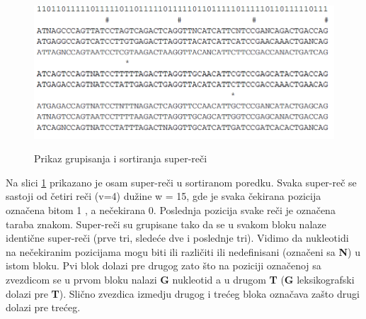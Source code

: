 \documentclass[a4paper]{article}
\begin{document}
{\begin{figure}[h!]
\begin{center}
\end{center}
\includegraphics[width=\textwidth]{superreci}
\label{fig:superreci}
\caption{Prikaz grupisanja i sortiranja super-reči}
\end{figure}

\indent Na slici \ref{fig:superreci} prikazano je osam super-reči u sortiranom poredku. Svaka super-reč se sastoji od četiri reči (v=4) dužine w = 15, gde je svaka čekirana pozicija označena bitom 1 , a nečekirana 0. Poslednja pozicija svake reči je označena taraba znakom. Super-reči su grupisane tako da se u svakom bloku nalaze identične super-reči (prve tri, sledeće dve i poslednje tri). Vidimo da nukleotidi na nečekiranim pozicijama mogu biti ili različiti ili nedefinisani (označeni sa \textbf{N}) u istom bloku. Pvi blok dolazi pre drugog zato što na poziciji označenoj sa zvezdicom se u prvom bloku nalazi \textbf{G} nukleotid a u drugom \textbf{T} (\textbf{G} leksikografski dolazi pre \textbf{T}). Slično zvezdica izmedju drugog i trećeg bloka označava zašto drugi dolazi pre trećeg.
}
\end{document}
